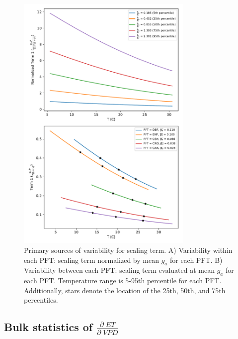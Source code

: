 \documentclass[draft,linenumbers]{agujournal}
\begin{document}
\begin{figure}[h]
\centering
\includegraphics[width=20pc]{./fig04.pdf}
\caption{Primary sources of variability for scaling term. A) Variability within each PFT: scaling term normalized by mean $g_a$ for each PFT. B) Variability between each PFT: scaling term evaluated at mean $g_a$ for each PFT. Temperature range is 5-95th percentile for each PFT. Additionally, stars denote the location of the 25th, 50th, and 75th percentiles.}
\label{scale_vary}
\end{figure}

\subsection{Bulk statistics of $\frac{\partial \; ET}{\partial \; VPD}$}
\end{document}
